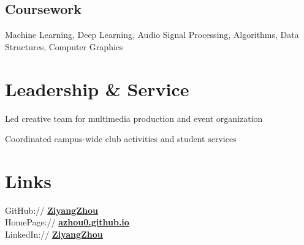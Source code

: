 \documentclass[]{deedy-resume-reversed}
\begin{document}
\subsection{Coursework}
Machine Learning, Deep Learning, Audio Signal Processing, Algorithms, Data Structures, Computer Graphics
\sectionsep


\section{Leadership \& Service}
Led creative team for multimedia production and event organization
\sectionsep

Coordinated campus-wide club activities and student services
\sectionsep


\section{Links}
GitHub:// \href{https://github.com/Azhou0/}{\bf ZiyangZhou} \\
HomePage:// \href{https://azhou0.github.io}{\bf azhou0.github.io}\\
LinkedIn:// \href{https://www.linkedin.com/in/azderic/}{\bf ZiyangZhou}
\end{document}
